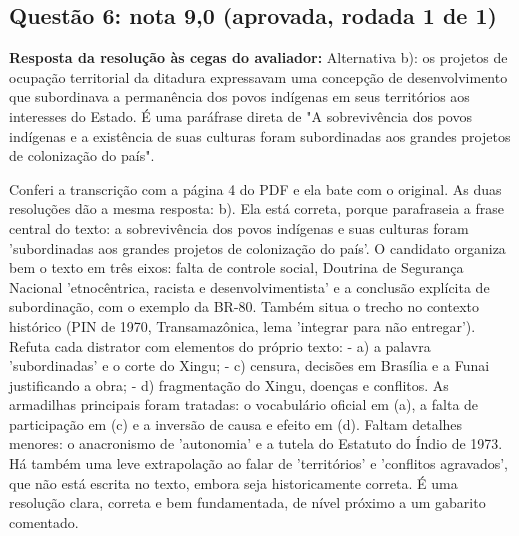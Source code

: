 \documentclass{article}%
\begin{document}
\subsection*{Questão 6: nota 9,0 (aprovada, rodada 1 de 1)}%
\textbf{Resposta da resolução às cegas do avaliador:} Alternativa b): os projetos de ocupação territorial da ditadura expressavam uma concepção de desenvolvimento que subordinava a permanência dos povos indígenas em seus territórios aos interesses do Estado. É uma paráfrase direta de "A sobrevivência dos povos indígenas e a existência de suas culturas foram subordinadas aos grandes projetos de colonização do país".\par %
Conferi a transcrição com a página 4 do PDF e ela bate com o original. As duas resoluções dão a mesma resposta: b). Ela está correta, porque parafraseia a frase central do texto: a sobrevivência dos povos indígenas e suas culturas foram 'subordinadas aos grandes projetos de colonização do país'.\newline%
\newline%
O candidato organiza bem o texto em três eixos: falta de controle social, Doutrina de Segurança Nacional 'etnocêntrica, racista e desenvolvimentista' e a conclusão explícita de subordinação, com o exemplo da BR{-}80. Também situa o trecho no contexto histórico (PIN de 1970, Transamazônica, lema 'integrar para não entregar'). Refuta cada distrator com elementos do próprio texto:\newline%
{-} a) a palavra 'subordinadas' e o corte do Xingu;\newline%
{-} c) censura, decisões em Brasília e a Funai justificando a obra;\newline%
{-} d) fragmentação do Xingu, doenças e conflitos.\newline%
\newline%
As armadilhas principais foram tratadas: o vocabulário oficial em (a), a falta de participação em (c) e a inversão de causa e efeito em (d). Faltam detalhes menores: o anacronismo de 'autonomia' e a tutela do Estatuto do Índio de 1973. Há também uma leve extrapolação ao falar de 'territórios' e 'conflitos agravados', que não está escrita no texto, embora seja historicamente correta.\newline%
\newline%
É uma resolução clara, correta e bem fundamentada, de nível próximo a um gabarito comentado.%
\end{document}
